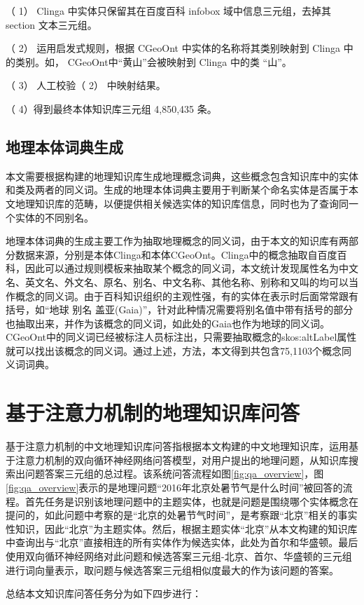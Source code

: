 （ 1） Clinga 中实体只保留其在百度百科 infobox 域中信息三元组，去掉其 section 文本三元组。

（ 2） 运用启发式规则，根据 CGeoOnt 中实体的名称将其类别映射到 Clinga 中的类别。如， CGeoOnt中“黄山”会被映射到 Clinga 中的类 “山”。

（ 3） 人工校验（ 2） 中映射结果。

（ 4）得到最终本体知识库三元组 4,850,435 条。

\subsection{地理本体词典生成}
本文需要根据构建的地理知识库生成地理概念词典，这些概念包含知识库中的实体和类及两者的同义词。生成的地理本体词典主要用于判断某个命名实体是否属于本文地理知识库的范畴，以便提供相关候选实体的知识库信息，同时也为了查询同一个实体的不同别名。

地理本体词典的生成主要工作为抽取地理概念的同义词，由于本文的知识库有两部分数据来源，分别是本体Clinga和本体CGeoOnt。Clinga中的概念抽取自百度百科，因此可以通过规则模板来抽取某个概念的同义词，本文统计发现属性名为中文名、英文名、外文名、原名、别名、中文名称、其他名称、别称和又叫的均可以当作概念的同义词。由于百科知识组织的主观性强，有的实体在表示时后面常常跟有括号，如“地球 别名 盖亚(Gaia)”，针对此种情况需要将别名值中带有括号的部分也抽取出来，并作为该概念的同义词，如此处的Gaia也作为地球的同义词。CGeoOnt中的同义词已经被标注人员标注出，只需要抽取概念的skos:altLabel属性就可以找出该概念的同义词。通过上述，方法，本文得到共包含75,1103个概念同义词词典。

\section{基于注意力机制的地理知识库问答}
基于注意力机制的中文地理知识库问答指根据本文构建的中文地理知识库，运用基于注意力机制的双向循环神经网络问答模型，对用户提出的地理问题，从知识库搜索出问题答案三元组的总过程。该系统问答流程如图\ref{fig:qa_overview}，图\ref{fig:qa_overview}表示的是地理问题“2016年北京处暑节气是什么时间”被回答的流程。首先任务是识别该地理问题中的主题实体，也就是问题是围绕哪个实体概念在提问的，如此问题中考察的是“北京的处暑节气时间”，是考察跟“北京”相关的事实性知识，因此“北京”为主题实体。然后，根据主题实体“北京”从本文构建的知识库中查询出与“北京”直接相连的所有实体作为候选实体，此处为首尔和华盛顿。最后使用双向循环神经网络对此问题和候选答案三元组-北京、首尔、华盛顿的三元组进行词向量表示，取问题与候选答案三元组相似度最大的作为该问题的答案。

总结本文知识库问答任务分为如下四步进行：

